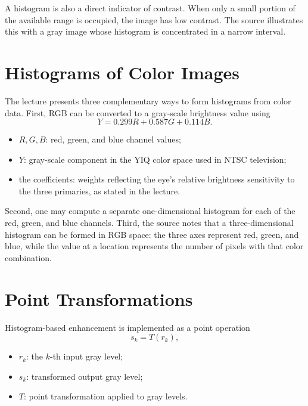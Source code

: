 \documentclass[11pt,a4paper,oneside]{report}
\newcommand{\mathlegend}[1]{%
  \par\vspace{0.2em}{\small\itshape where}\par
  \begin{itemize}[leftmargin=1.7em,topsep=0.15em,itemsep=0.12em]
  #1
  \end{itemize}
}
\begin{document}
A histogram is also a direct indicator of contrast. When only a small portion of the available range is occupied, the image has low contrast. The source illustrates this with a gray image whose histogram is concentrated in a narrow interval.



\section{Histograms of Color Images}

The lecture presents three complementary ways to form histograms from color data. First, RGB can be converted to a gray-scale brightness value using
\begin{equation}
Y=0.299R+0.587G+0.114B.
\label{eq:rgb-to-y-hist}
\end{equation}
\mathlegend{
  \item $R,G,B$: red, green, and blue channel values;
  \item $Y$: gray-scale component in the YIQ color space used in NTSC television;
  \item the coefficients: weights reflecting the eye's relative brightness sensitivity to the three primaries, as stated in the lecture.
}

Second, one may compute a separate one-dimensional histogram for each of the red, green, and blue channels. Third, the source notes that a three-dimensional histogram can be formed in RGB space: the three axes represent red, green, and blue, while the value at a location represents the number of pixels with that color combination.



\section{Point Transformations}

Histogram-based enhancement is implemented as a point operation
\begin{equation}
  s_k=T(r_k),
  \label{eq:hist-point-transform}
\end{equation}
\mathlegend{
  \item $r_k$: the $k$-th input gray level;
  \item $s_k$: transformed output gray level;
  \item $T$: point transformation applied to gray levels.
}
\end{document}
